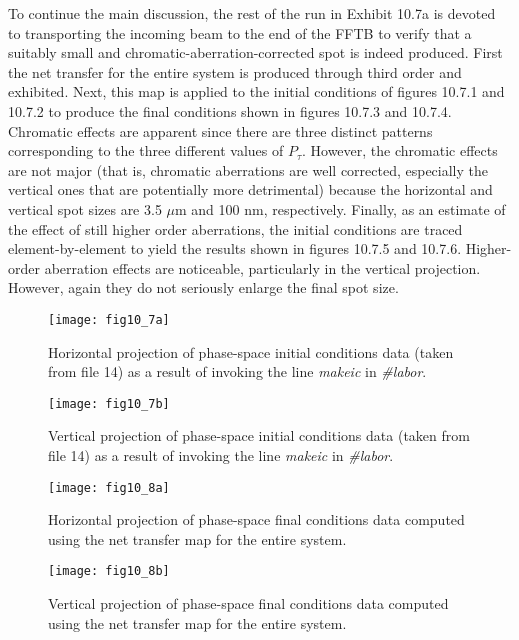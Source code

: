 To continue the main discussion, the rest of the \Mary run in Exhibit
10.7a is devoted to transporting the incoming beam to the end of the FFTB
to verify that a suitably small and chromatic-aberration-corrected spot
is indeed produced.  First the net transfer for the entire system is
produced through third order and exhibited.  Next, this map is applied to
the initial conditions of figures 10.7.1 and 10.7.2 to produce the final conditions
shown in figures 10.7.3 and 10.7.4.  Chromatic effects are apparent since there are
three distinct patterns corresponding to the three different values of
$P_{\tau}$.  However, the chromatic effects are not major (that is,
chromatic aberrations are well corrected, especially the vertical ones
that are potentially more detrimental) because the horizontal and
vertical spot sizes are 3.5 $\mu$m and 100 nm, respectively.  Finally, as
an estimate of the effect of still higher order aberrations, the initial
conditions are traced element-by-element to yield the results shown in
figures 10.7.5 and 10.7.6.  Higher-order aberration effects are noticeable,
particularly in the vertical projection.  However, again they do not seriously
enlarge the final spot size.

\newpage
\begin{figure}[htbp]
\renewcommand{\thefigure}{\thesection.\arabic{figure}}
  \centering
  \texttt{[image: fig10\_7a]}
  \caption{Horizontal projection of phase-space initial conditions data
(taken from file 14) as a result of invoking the line {\em makeic} in
{\em \#labor}.}
\end{figure}

\newpage
\begin{figure}[htbp]
\renewcommand{\thefigure}{\thesection.\arabic{figure}}
  \centering
  \texttt{[image: fig10\_7b]}
  \caption{Vertical projection of phase-space initial conditions data
(taken from file 14) as a result of invoking the line {\em makeic} in
{\em \#labor}.}
\end{figure}

\newpage
\begin{figure}[htbp]
\renewcommand{\thefigure}{\thesection.\arabic{figure}}
  \centering
  \texttt{[image: fig10\_8a]}
  \caption{Horizontal projection of phase-space final conditions data
computed using the net transfer map for the entire system.}
\end{figure}

\newpage
\begin{figure}[htbp]
\renewcommand{\thefigure}{\thesection.\arabic{figure}}
  \centering
  \texttt{[image: fig10\_8b]}
  \caption{Vertical projection of phase-space final conditions data
computed using the net transfer map for the entire system.}
\end{figure}

